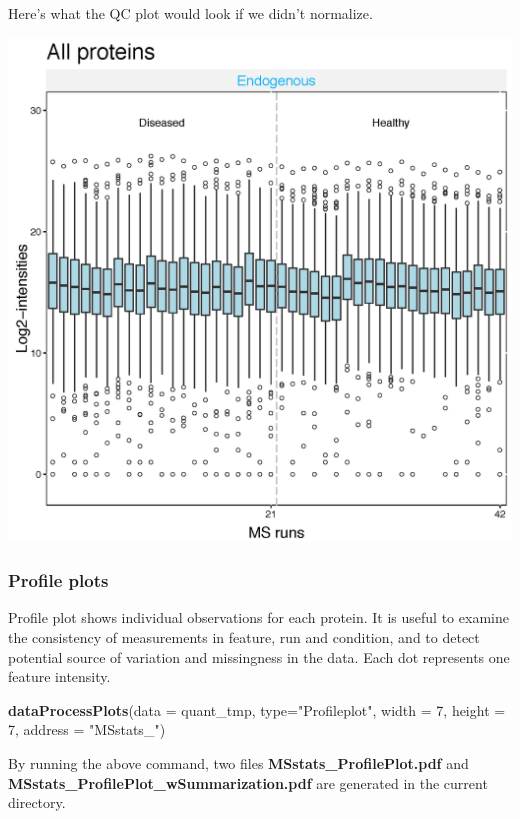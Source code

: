 \documentclass[]{book}
\newenvironment{Shaded}{\begin{snugshade}}{\end{snugshade}}
\newcommand{\DataTypeTok}[1]{\textcolor[rgb]{0.13,0.29,0.53}{#1}}
\newcommand{\DecValTok}[1]{\textcolor[rgb]{0.00,0.00,0.81}{#1}}
\newcommand{\KeywordTok}[1]{\textcolor[rgb]{0.13,0.29,0.53}{\textbf{#1}}}
\newcommand{\NormalTok}[1]{#1}
\newcommand{\StringTok}[1]{\textcolor[rgb]{0.31,0.60,0.02}{#1}}
\begin{document}
Here's what the QC plot would look if we didn't normalize.

\includegraphics{img/MSstats_nonorm_QCPlot.png}

\hypertarget{profile-plots}{%
\subsubsection{Profile plots}\label{profile-plots}}

Profile plot shows individual observations for each protein. It is useful to examine the consistency of measurements in feature, run and condition, and to detect potential source of variation and missingness in the data. Each dot represents one feature intensity.

\begin{Shaded}
\begin{Highlighting}[]
\KeywordTok{dataProcessPlots}\NormalTok{(}\DataTypeTok{data =}\NormalTok{ quant_tmp, }\DataTypeTok{type=}\StringTok{"Profileplot"}\NormalTok{, }
                 \DataTypeTok{width =} \DecValTok{7}\NormalTok{, }\DataTypeTok{height =} \DecValTok{7}\NormalTok{, }\DataTypeTok{address =} \StringTok{"MSstats_"}\NormalTok{)}
\end{Highlighting}
\end{Shaded}

By running the above command, two files \textbf{MSstats\_ProfilePlot.pdf} and \textbf{MSstats\_ProfilePlot\_wSummarization.pdf} are generated in the current directory.
\end{document}
